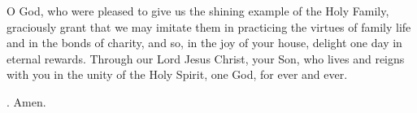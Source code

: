 \lettrine[lines=3]{O}{} God, who were pleased to give us
the shining example of the Holy Family,
graciously grant that we may imitate them
in practicing the virtues of family life and in the bonds of charity,
and so, in the joy of your house,
delight one day in eternal rewards.
Through our Lord Jesus Christ, your Son,
who lives and reigns with you in the unity of the Holy Spirit,
one God, for ever and ever. \par \Rbar. Amen.